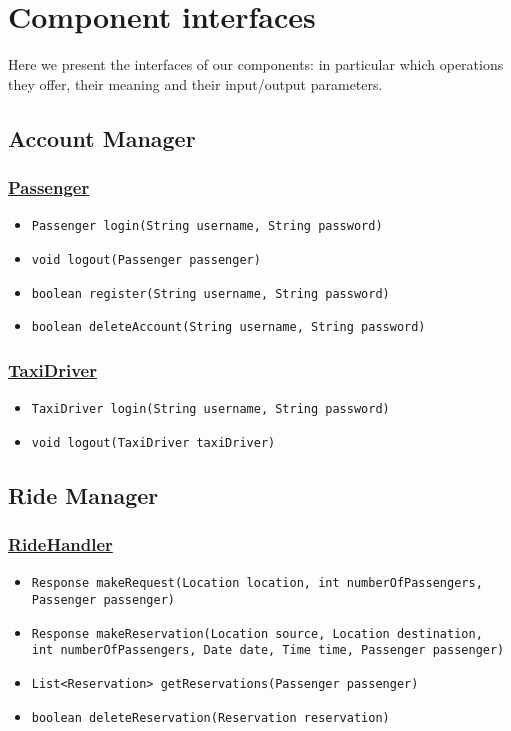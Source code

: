 \section{Component interfaces}\label{componentInterfaces}
Here we present the interfaces of our components: in particular which operations they offer, their meaning and their input/output parameters.
\subsection{Account Manager}
\subsubsection{\underline{Passenger}}
\begin{itemize}
	\item \texttt{Passenger login(String username, String password)}
	\item \texttt{void logout(Passenger passenger)}
	\item \texttt{boolean register(String username, String password)}
	\item \texttt{boolean deleteAccount(String username, String password)}
\end{itemize}
\subsubsection{\underline{TaxiDriver}}
\begin{itemize}
	\item \texttt{TaxiDriver login(String username, String password)}
	\item \texttt{void logout(TaxiDriver taxiDriver)}
\end{itemize}
\subsection{Ride Manager}
\subsubsection{\underline{RideHandler}}
\begin{itemize}
	\item \texttt{Response makeRequest(Location location, int numberOfPassengers,\\ Passenger passenger)}
	\item \texttt{Response makeReservation(Location source, Location destination, \\ int numberOfPassengers, Date date, Time time, Passenger passenger)}
	\item \texttt{List<Reservation> getReservations(Passenger passenger)}
	\item \texttt{boolean deleteReservation(Reservation reservation)}
\end{itemize}
